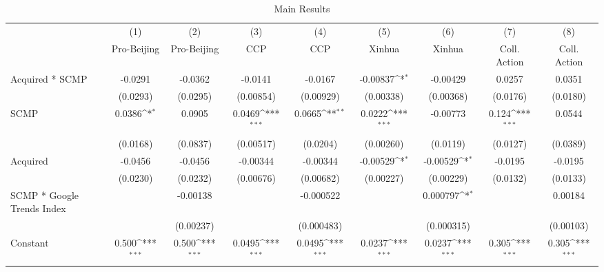 \begin{sidewaystable}[htbp]\centering
\def\sym#1{\ifmmode^{#1}\else\(^{#1}\)\fi}
\caption{Main Results\label{table:main}}
\begin{tabular}{l*{8}{c}}
\hline\hline
                &\multicolumn{1}{c}{(1)}&\multicolumn{1}{c}{(2)}&\multicolumn{1}{c}{(3)}&\multicolumn{1}{c}{(4)}&\multicolumn{1}{c}{(5)}&\multicolumn{1}{c}{(6)}&\multicolumn{1}{c}{(7)}&\multicolumn{1}{c}{(8)}\\
                &\multicolumn{1}{c}{Pro-Beijing}&\multicolumn{1}{c}{Pro-Beijing}&\multicolumn{1}{c}{CCP}&\multicolumn{1}{c}{CCP}&\multicolumn{1}{c}{Xinhua}&\multicolumn{1}{c}{Xinhua}&\multicolumn{1}{c}{Coll. Action}&\multicolumn{1}{c}{Coll. Action}\\
\hline
Acquired * SCMP &  -0.0291         &  -0.0362         &  -0.0141         &  -0.0167         & -0.00837\sym{*}  & -0.00429         &   0.0257         &   0.0351         \\
                & (0.0293)         & (0.0295)         &(0.00854)         &(0.00929)         &(0.00338)         &(0.00368)         & (0.0176)         & (0.0180)         \\
[1em]
SCMP            &   0.0386\sym{*}  &   0.0905         &   0.0469\sym{***}&   0.0665\sym{**} &   0.0222\sym{***}& -0.00773         &    0.124\sym{***}&   0.0544         \\
                & (0.0168)         & (0.0837)         &(0.00517)         & (0.0204)         &(0.00260)         & (0.0119)         & (0.0127)         & (0.0389)         \\
[1em]
Acquired        &  -0.0456         &  -0.0456         & -0.00344         & -0.00344         & -0.00529\sym{*}  & -0.00529\sym{*}  &  -0.0195         &  -0.0195         \\
                & (0.0230)         & (0.0232)         &(0.00676)         &(0.00682)         &(0.00227)         &(0.00229)         & (0.0132)         & (0.0133)         \\
[1em]
SCMP * Google Trends Index&                  & -0.00138         &                  &-0.000522         &                  & 0.000797\sym{*}  &                  &  0.00184         \\
                &                  &(0.00237)         &                  &(0.000483)         &                  &(0.000315)         &                  &(0.00103)         \\
[1em]
Constant        &    0.500\sym{***}&    0.500\sym{***}&   0.0495\sym{***}&   0.0495\sym{***}&   0.0237\sym{***}&   0.0237\sym{***}&    0.305\sym{***}&    0.305\sym{***}\\

\end{tabular}
\end{sidewaystable}
